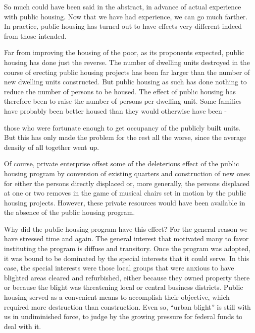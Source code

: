 \documentclass[11pt,openany]{book}
\begin{document}
So much could have been said in the abstract, in advance of actual experience with public housing. Now that we have had experience, we can go much farther. In practice, public housing has turned out to have effects very different indeed from those intended.

Far from improving the housing of the poor, as its proponents expected, public housing has done just the reverse. The number of dwelling units destroyed in the course of erecting public housing projects has been far larger than the number of new dwelling units constructed. But public housing as such has done nothing to reduce the number of persons to be housed. The effect of public housing has therefore been to raise the number of persons per dwelling unit. Some families have probably been better housed than they would otherwise have been -

those who were fortunate enough to get occupancy of the publicly built units. But this has only made the problem for the rest all the worse, since the average density of all together went up.

Of course, private enterprise offset some of the deleterious effect of the public housing program by conversion of existing quarters and construction of new ones for either the persons directly displaced or, more generally, the persons displaced at one or two removes in the game of musical chairs set in motion by the public housing projects. However, these private resources would have been available in the absence of the public housing program.

Why did the public housing program have this effect? For the general reason we have stressed time and again. The general interest that motivated many to favor instituting the program is diffuse and transitory. Once the program was adopted, it was bound to be dominated by the special interests that it could serve. In this case, the special interests were those local groups that were anxious to have blighted areas cleared and refurbished, either because they owned property there or because the blight was threatening local or central business districts. Public housing served as a convenient means to accomplish their objective, which required more destruction than construction. Even so, ``urban blight'' is still with us in undiminished force, to judge by the growing pressure for federal funds to deal with it.
\end{document}
